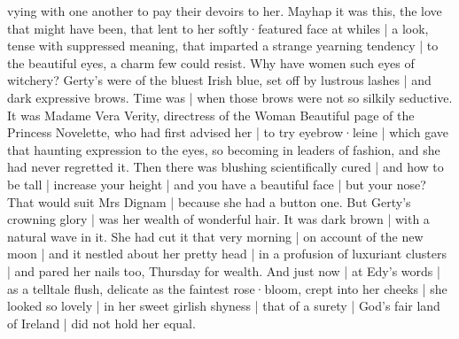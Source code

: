 vying with one another to pay their devoirs to her.
Mayhap it was this,
the love that might have been,
that lent to her softly·featured face at whiles |
a look,
tense with suppressed meaning,
that imparted a strange yearning tendency |
to the beautiful eyes,
a charm few could resist.
Why have women such eyes of witchery?
Gerty's were of the bluest Irish blue,
set off by lustrous lashes |
and dark expressive brows.
Time was |
when those brows were not so silkily seductive.
It was Madame Vera Verity,%
directress of the Woman Beautiful page of the Princess Novelette,
who had first advised her |
to try eyebrow·leine |
which gave that haunting expression to the eyes,
so becoming in leaders of fashion,
and she had never regretted it.
Then there was blushing scientifically cured |
and how to be tall |
increase your height |
and you have a beautiful face |
but your nose?
That would suit Mrs Dignam |
because she had a button one.
But Gerty's crowning glory |
was her wealth of wonderful hair.
It was dark brown |
with a natural wave in it.
She had cut it that very morning |
on account of the new moon |
and it nestled about her pretty head |
in a profusion of luxuriant clusters |
and pared her nails too,
Thursday for wealth.
And just now |
at Edy's words |
as a telltale flush,%
delicate as the faintest rose·bloom,
crept into her cheeks |
she looked so lovely |
in her sweet girlish shyness |
that of a surety |
God's fair land of Ireland |
did not hold her equal.

